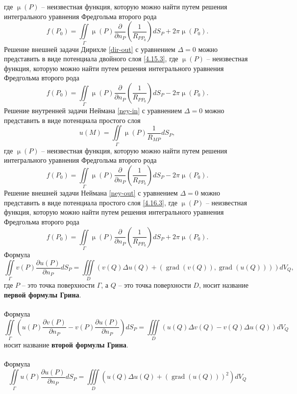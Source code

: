 \documentclass[a4paper, 12pt]{report}
\numberwithin{equation}{section}
\renewcommand{\mu}{\upmu}
\newcommand{\pderiv}[2]{\dfrac{\partial #1}{\partial #2}}
\newcommand{\grad}{\operatorname{grad}}
\begin{document}
	где $\mu(P)$ -- неизвестная функция, которую можно найти путем решения интегрального уравнения Фредгольма второго рода
	$$f(P_0)=\iint\limits_\Gamma\mu(P)\pderiv{}{n_P}\left(\frac{1}{R_{PP_0}}\right)dS_P+2\pi\mu(P_0).$$
	Решение внешней задачи Дирихле \eqref{dir-out} с уравнением $\Delta = 0$ можно представить в виде потенциала двойного слоя \eqref{4.15.3}, где $\mu(P)$ -- неизвестная функция, которую можно найти путем решения интегрального уравнения Фредгольма второго рода
	$$f(P_0)=\iint\limits_\Gamma \mu(P)\pderiv{}{n_P}\left(\frac{1}{R_{PP_0}}\right)dS_P-2\pi\mu(P_0).$$
	Решение внутренней задачи Неймана \eqref{ney-in} с уравнением $\Delta = 0$ можно представить в виде потенциала простого слоя
	\begin{equation}\label{4.16.3}
		u(M)=\iint\limits_\Gamma \mu(P)\frac{1}{R_{MP}}dS_P,
	\end{equation}
	где $\mu(P)$ -- неизвестная функция, которую можно найти путем решения интегрального уравнения Фредгольма второго рода
	$$f(P_0)=\iint\limits_\Gamma\mu(P)\pderiv{}{n_P}\left(\frac{1}{R_{PP_0}}\right)dS_P-2\pi\mu(P_0).$$
	Решение внешней задачи Неймана \eqref{ney-out} с уравнением $\Delta = 0$ можно представить в виде потенциала простого слоя
	\eqref{4.16.3},
	где $\mu(P)$ -- неизвестная функция, которую можно найти путем решения интегрального уравнения Фредгольма второго рода
	$$f(P_0)=\iint\limits_\Gamma\mu(P)\pderiv{}{n_P}\left(\frac{1}{R_{PP_0}}\right)dS_P+2\pi\mu(P_0).$$
	Формула \begin{equation}\label{4.1.1}
		\iint\limits_\Gamma v(P)\pderiv{u(P)}{n_P}dS_P=\iiint\limits_D\left(v(Q)\Delta u(Q)+(\grad(v(Q)),\grad(u(Q)))\right)dV_Q,
	\end{equation}
	где $P$ -- это точка поверхности $\Gamma$, а $Q$ -- это точка поверхности $D$, носит название \textbf{первой формулы Грина}.\\\\
	Формула
	\begin{equation}\label{4.1.3}
		\iint\limits_\Gamma\left(u(P)\pderiv{v(P)}{n_P}-v(P)\pderiv{u(P)}{n_P}\right)dS_P=\iiint\limits_D\left(u(Q)\Delta v(Q)-v(Q)\Delta u(Q)\right)dV_Q
	\end{equation}
	носит название \textbf{второй формулы Грина}.\\\\
	Формула
	\begin{equation}\label{4.1.4}
		\iint\limits_\Gamma u(P)\pderiv{u(P)}{n_P}dS_P=\iiint\limits_D\left(u(Q)\Delta u(Q)+(\grad(u(Q)))^2\right)dV_Q
	\end{equation}
\end{document}

